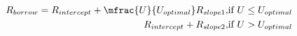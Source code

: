 \documentclass[preview]{standalone}
\begin{document}
\begin{align*}
R_{borrow} = R_{intercept} + \mfrac{U}{U_{optimal}}R_{slope1}, & \text{if } U \leq U_{optimal} \\ R_{intercept} + R_{slope2}, & \text{if } U > U_{optimal}
\end{align*}
\end{document}

